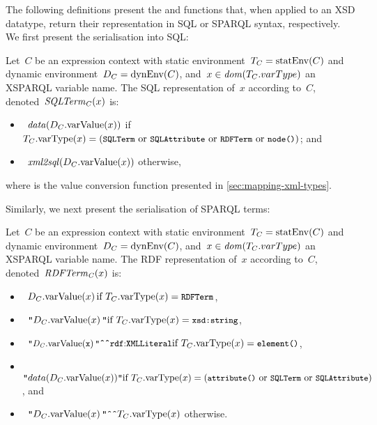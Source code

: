 %
The following definitions present the  and  functions that, when applied to an
\ac{XSD} datatype, return their representation in \ac{SQL} or SPARQL syntax, respectively.  We first present the
serialisation into \ac{SQL}:
%
\begin{definition}
  \label{def:sqlTerm}
  Let~$C$ be an expression context with static environment~$T_C = \mathit{\mathrm{statEnv}}\!\left(C\right)$ and dynamic environment~$D_C =
  \mathit{{\textrm{dynEnv}}}\!\left(C\right)$, and~$x \in \mathit{dom}\!\left(T_C.varType\right)$ an XSPARQL variable name.
  The \ac{SQL} representation of~$x$ according to~$C$, denoted~$\mathit{SQLTerm_C}\!\left(x\right)$ is:
  \begin{itemize}[noitemsep]
  \item~$\mathit{data}\!\left(D_C.\mathit{\textrm{varValue}}\!\left(x\right)\right)$ \hfill if $T_C.\mathit{\textrm{varType}}\!\left(x\right) =
    (\texttt{{\small SQLTerm}} \textrm{ or } \texttt{{\small SQLAttribute}} \textrm{ or } \texttt{{\small RDFTerm}}  \textrm{ or } \texttt{{\small node()}})$; and
  \item~$\mathit{xml2sql}\!\left(D_C.\mathit{\textrm{varValue}}\!\left(x\right)\right)$ \hfill otherwise, 
  \end{itemize}
  where  is the value conversion function presented in \cref{sec:mapping-xml-types}.
\end{definition}
%
Similarly, we next present the serialisation of SPARQL terms:
%
\begin{definition}
  \label{def:sparqlTerm}
  Let~$C$ be an expression context with static environment~$T_C = \mathit{\mathrm{statEnv}}\!\left(C\right)$ and dynamic environment~$D_C =
  \mathit{{\textrm{dynEnv}}}\!\left(C\right)$, and~$x \in \mathit{dom}\!\left(T_C.varType\right)$ an XSPARQL variable name.
  The \ac{RDF} representation of~$x$ according to~$C$, denoted~$\mathit{RDFTerm_C}\!\left(x\right)$ is:
  \begin{itemize}[noitemsep]
  \item~$D_C.\funcCall{\ecomp{varValue}}{x} \hfill \textrm{if } T_C.\funcCall{\ecomp{varType}}{x} = \type{RDFTerm}$,
  \item~$\texttt{"}D_C.\funcCall{\ecomp{varValue}}{x}\texttt{"} \hfill\textrm{if } T_C.\funcCall{\ecomp{varType}}{x} = \type{xsd:string}$,
  \item~$\dt{\funcCall{D_C.\ecomp{varValue}}{\ensuremath{x}}}{\qname{rdf}{XMLLiteral}} \hfill \textrm{if }
    T_C.\funcCall{\ecomp{varType}}{x} = \type{element()}$,
  \item~$\texttt{"}data(D_C.\funcCall{\ecomp{varValue}}{x})\texttt{"} \hfill \textrm{if } T_C.\funcCall{\ecomp{varType}}{x} =
    (\type{attribute()} \textrm{ or } \type{SQLTerm} \textrm{ or } \type{SQLAttribute})$, and
  \item~$\texttt{"}D_C.\mathit{\textrm{varValue}}\!\left(x\right)\texttt{"\^{}\^{}}T_C.\mathit{\textrm{varType}}\!\left(x\right)$ \hfill
    otherwise.
  \end{itemize}
\end{definition}

